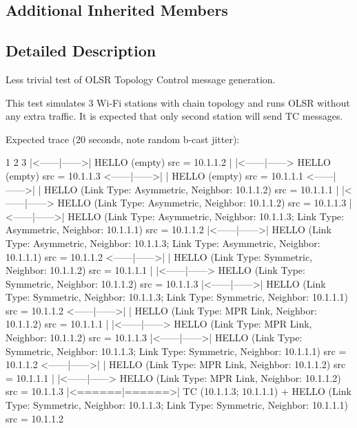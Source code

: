 \subsection*{Additional Inherited Members}


\subsection{Detailed Description}
Less trivial test of O\+L\+SR Topology Control message generation. 

This test simulates 3 Wi-\/\+Fi stations with chain topology and runs O\+L\+SR without any extra traffic. It is expected that only second station will send TC messages.

Expected trace (20 seconds, note random b-\/cast jitter)\+: \begin{DoxyVerb}       1       2       3
       |<------|------>|              HELLO (empty) src = 10.1.1.2
       |       |<------|------>       HELLO (empty) src = 10.1.1.3
<------|------>|       |              HELLO (empty) src = 10.1.1.1
<------|------>|       |              HELLO (Link Type: Asymmetric, Neighbor: 10.1.1.2) src = 10.1.1.1
       |       |<------|------>       HELLO (Link Type: Asymmetric, Neighbor: 10.1.1.2) src = 10.1.1.3
       |<------|------>|              HELLO (Link Type: Asymmetric, Neighbor: 10.1.1.3; Link Type: Asymmetric, Neighbor: 10.1.1.1) src = 10.1.1.2
       |<------|------>|              HELLO (Link Type: Asymmetric, Neighbor: 10.1.1.3; Link Type: Asymmetric, Neighbor: 10.1.1.1) src = 10.1.1.2
<------|------>|       |              HELLO (Link Type: Symmetric, Neighbor: 10.1.1.2) src = 10.1.1.1
       |       |<------|------>       HELLO (Link Type: Symmetric, Neighbor: 10.1.1.2) src = 10.1.1.3
       |<------|------>|              HELLO (Link Type: Symmetric, Neighbor: 10.1.1.3; Link Type: Symmetric, Neighbor: 10.1.1.1) src = 10.1.1.2
<------|------>|       |              HELLO (Link Type: MPR Link, Neighbor: 10.1.1.2) src = 10.1.1.1
       |       |<------|------>       HELLO (Link Type: MPR Link, Neighbor: 10.1.1.2) src = 10.1.1.3
       |<------|------>|              HELLO (Link Type: Symmetric, Neighbor: 10.1.1.3; Link Type: Symmetric, Neighbor: 10.1.1.1) src = 10.1.1.2
<------|------>|       |              HELLO (Link Type: MPR Link, Neighbor: 10.1.1.2) src = 10.1.1.1
       |       |<------|------>       HELLO (Link Type: MPR Link, Neighbor: 10.1.1.2) src = 10.1.1.3
       |<======|======>|              TC (10.1.1.3; 10.1.1.1) + HELLO (Link Type: Symmetric, Neighbor: 10.1.1.3; Link Type: Symmetric, Neighbor: 10.1.1.1) src = 10.1.1.2

\end{DoxyVerb}
